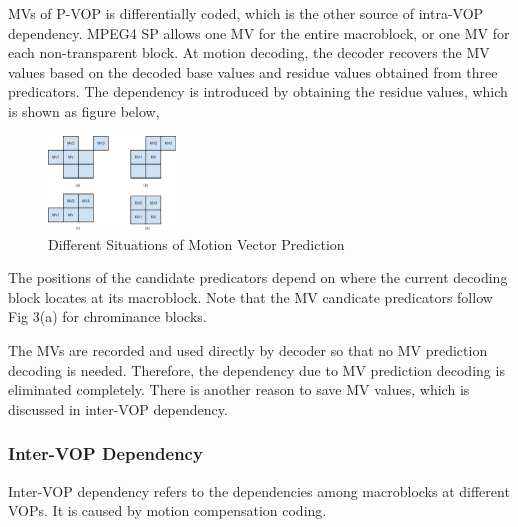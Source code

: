 MVs of P-VOP is differentially coded, which is the other source of intra-VOP dependency. MPEG4 SP allows one MV for the entire macroblock, or one MV for each non-transparent block. At motion decoding, the decoder recovers the MV values based on the decoded base values and residue values obtained from three predicators. The dependency is introduced by obtaining the residue values, which is shown as figure below,
\begin{figure}
\centering
\includegraphics[height=2.5cm]{mv.eps}
\caption{Different Situations of Motion Vector Prediction}
\end{figure}
The positions of the candidate predicators depend on where the current decoding block locates at its macroblock. Note that the MV candicate predicators follow Fig 3(a) for chrominance blocks. 

The MVs are recorded and used directly by decoder so that no MV prediction decoding is needed. Therefore, the dependency due to MV prediction decoding is eliminated completely. There is another reason to save MV values, which is discussed in inter-VOP dependency. 
  
\subsubsection{Inter-VOP Dependency}
Inter-VOP dependency refers to the dependencies among macroblocks at different VOPs. It is caused by motion compensation coding.

